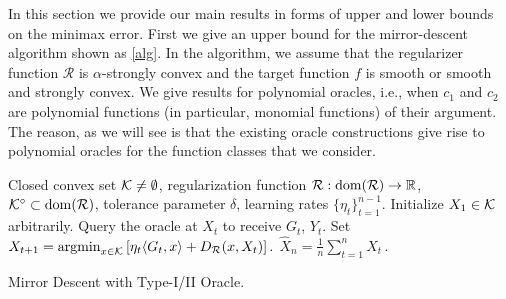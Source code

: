 
In this section we provide our main results in forms of upper and lower bounds on the minimax error.
First we give an upper bound for the mirror-descent algorithm shown as \cref{alg}.
In the algorithm, we assume that the regularizer function $\mathcal{R}$ is $\alpha$-strongly convex and the target function $f$ is smooth or  smooth and strongly convex.
We give results for polynomial oracles, i.e., when $c_1$ and $c_2$ are polynomial functions (in particular, monomial functions)
of their argument. The reason, as we will see is that the existing oracle constructions give rise to polynomial oracles for the function classes that we consider.

%

\begin{algorithm}[t]
\begin{algorithmic}
      Closed convex set $\mathcal{K}\ne \emptyset$, regularization function $\mathcal{R}:\operatorname{dom}(\mathcal{R})\to \mathbb{R}$, $\mathcal{K}^{\circ}\subset \operatorname{dom}(\mathcal{R})$, tolerance parameter $\delta$, learning rates $\{\eta_t\}_{t=1}^{n-1}$.
\State Initialize $X_1\in \mathcal{K}$ arbitrarily.
	\State Query the oracle at $X_t$ to receive $G_t$, $Y_t$.
	\State Set
	$X_{t+1}=\operatorname{argmin}_{x\in \mathcal{K}}\left[ \eta_{t} \langle G_t,x \rangle+D_{\mathcal{R}}(x,X_t) \right].$
\EndFor
{} $\hat{X}_n = \frac{1}{n}\sum_{t=1}^n X_t \,.$
\end{algorithmic}
\caption{Mirror Descent with Type-I/II Oracle.
\label{alg}}
\end{algorithm}


